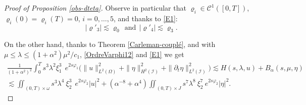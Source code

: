 \documentclass[a4paper, 12pt]{article}
\theoremstyle{plain}
\theoremstyle{definition}
\numberwithin{theorem}{section}
\numberwithin{equation}{section}
\begin{document}
{\begin{proof}[Proof of Proposition \ref{obs-dteta}]
Observe in particular that $\varrho_i\in\mathscr{C}^1([0,T])$, $\varrho_i(0)=\varrho_i(T)=0$, $i=0,\dots, 5$, and thanks to \eqref{E1}:
\begin{equation}\label{bound-rho}
|\varrho'_3|\lesssim\varrho_0~~\text{and}~~|\varrho'_4|\lesssim\varrho_3.
\end{equation}

On the other hand, thanks to Theorem \ref{Carleman-couplé}, and with $\mu \leq \lambda \leq (1+\alpha^2)\mu^2/c_1$, \eqref{OrdreVarphi12} and \eqref{E1} we get 
\begin{multline}\label{Carl-gele1}
\frac{1}{(1+\alpha^2)^2}\int_{0}^Ts^3\lambda^2\xi_1^3~~e^{2s\varphi_1}\big(\|u\|_{L^2(\Omega)}^2+\|\eta\|^2_{H^2(\mathcal{I})}+\|\partial_t\eta\|^2_{L^2(\mathcal{I})}\big)\lesssim 
H(s,\lambda, u)+B_\alpha(s,\mu,\eta) \\
\lesssim \iint_{(0,T)\times\omega}s^3\lambda^4~ \xi^3_2~~e^{2s\varphi_2}| u|^2+ \left(\alpha^{-8}+\alpha^4\right)\iint_{(0,T)\times J}s^7\lambda^8~\xi^7_2~e^{2s\varphi_2}|\eta|^2.
\end{multline}


\end{proof}}
\end{document}
